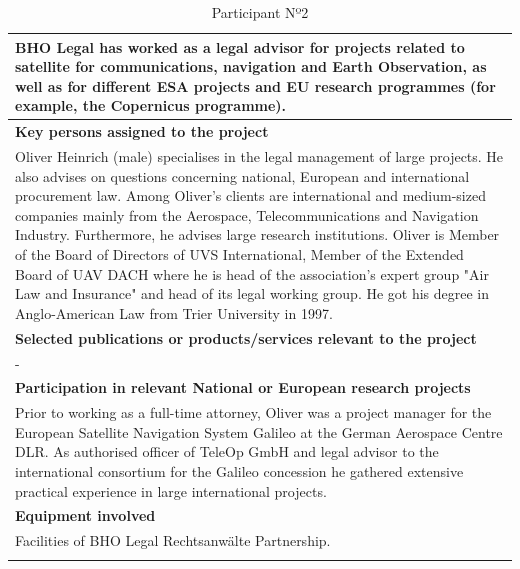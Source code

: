 \begin{longtable}[H]{|p{0.7cm}|p{4cm}|p{7cm}|p{1.3cm}|}
	\multicolumn{4}{|p{14.5cm}|}{BHO Legal has worked as a legal advisor for projects related to satellite for communications, navigation and Earth Observation, as well as for different ESA projects and EU research programmes (for example, the Copernicus programme).}  \\ \hline
	
	\multicolumn{4}{|p{13cm}|}{\textbf{Key persons assigned to the project}}   \\ \hline
	
	\multicolumn{4}{|p{14.5cm}|}{Oliver Heinrich (male) specialises in the legal management of large projects. He also advises on questions concerning national, European and international procurement law. Among Oliver's clients are international and medium-sized companies mainly from the Aerospace, Telecommunications and Navigation Industry. Furthermore, he advises large research institutions. Oliver is Member of the Board of Directors of UVS International, Member of the Extended Board of UAV DACH where he is head of the association’s expert group "Air Law and Insurance" and head of its legal working group. He got his degree in Anglo-American Law from Trier University in 1997.}  \\ \hline
	
	\multicolumn{4}{|p{13cm}|}{\textbf{Selected publications or products/services relevant to the project}}  \\ \hline
	
	\multicolumn{4}{|p{14.5cm}|}{-}  \\ \hline
	
	\multicolumn{4}{|p{13cm}|}{\textbf{Participation in relevant National or European research projects}}  \\ \hline
	
	\multicolumn{4}{|p{14.5cm}|}{Prior to working as a full-time attorney, Oliver was a project manager for the European Satellite Navigation System Galileo at the German Aerospace Centre DLR. As authorised officer of TeleOp GmbH and legal advisor to the international consortium for the Galileo concession he gathered extensive practical experience in large international projects. }  \\ \hline
	
	\multicolumn{4}{|p{13cm}|}{\textbf{Equipment involved}}  \\ \hline
	
	\multicolumn{4}{|p{14.5cm}|}{Facilities of BHO Legal Rechtsanwälte Partnership.}  \\ \hline
	\caption{Participant Nº2}
\end{longtable}



